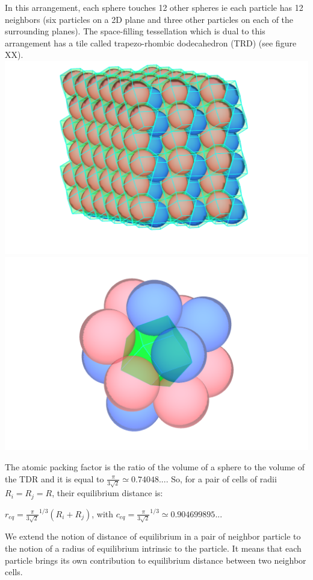 In this arrangement, each sphere touches 12 other spheres ie each particle has 12 neighbors (six particles on a 2D plane and three other particles on each of the surrounding planes). The space-filling tessellation which is dual to this arrangement has a tile called trapezo-rhombic dodecahedron (TRD) (see figure XX).
\includegraphics{../../images/MECAGEN/potential/trapezo_swarm.png}
\includegraphics{../../images/MECAGEN/potential/trapezorhombicdodecahedron.png}

The atomic packing factor is the ratio of the volume of a sphere to the volume of the TDR and it is equal to $\frac{\pi}{3\sqrt{2}} \simeq 0.74048... $. So, for a pair of cells of radii $R_i = R_j=R$, their equilibrium distance is:

$ r_{eq} = {\frac{\pi}{3\sqrt{2}}} ^ {1/3} \left ( R_i + R_j \right ) $, with $c_{eq} = {\frac{\pi}{3\sqrt{2}}} ^ {1/3} \simeq 0.904699895...$ 

We extend the notion of distance of equilibrium in a pair of neighbor particle to the notion of a radius of equilibrium intrinsic to the particle. It means that each particle brings its own contribution to equilibrium distance between two neighbor cells.   

